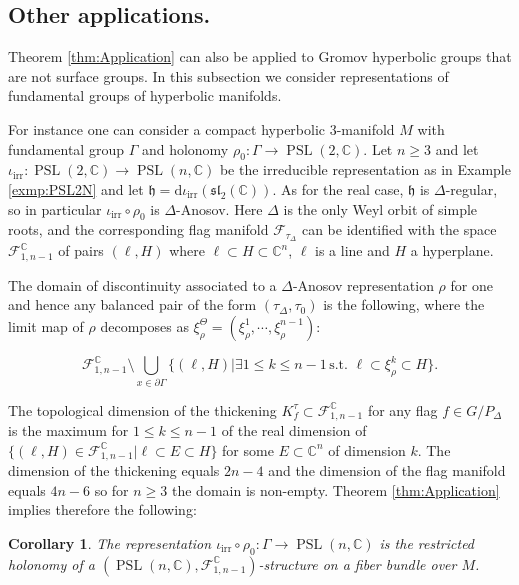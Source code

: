 \documentclass[reqno,10pt]{amsart}
\theoremstyle{plain}
\newtheorem{cor}[thm]{Corollary}
\theoremstyle{definition}
\theoremstyle{remark}
\newcommand{\type}{\tau}
\newcommand{\C}{\mathbb{C}}
\DeclareMathOperator{\PSL}{PSL}
\begin{document}
\subsection{Other applications.}
\label{subsec:HigherDimention}
Theorem \ref{thm:Application} can also be applied to Gromov hyperbolic groups that are not surface groups. In this subsection we consider representations of fundamental groups of hyperbolic manifolds.

\medskip

For instance one can consider a compact hyperbolic $3$-manifold $M$ with fundamental group $\Gamma$ and holonomy $\rho_0:\Gamma\to \PSL(2,\C)$. Let $n\geq 3$ and let $\iota_\text{irr}:\PSL(2,\C)\to \PSL(n,\C)$ be the irreducible representation as in Example \ref{exmp:PSL2N} and let $\mathfrak{h}=\mathrm{d}\iota_\text{irr}(\mathfrak{sl}_2(\C))$. As for the real case, $\mathfrak{h}$ is $\Delta$-regular, so in particular $\iota_\text{irr}\circ \rho_0$ is $\Delta$-Anosov. Here $\Delta$ is the only Weyl orbit of simple roots, and the corresponding flag manifold $\mathcal{F}_{\tau_\Delta}$ can be identified with the space $\mathcal{F}_{1,n-1}^\C$ of pairs $(\ell,H)$ where $\ell\subset H\subset \C^n$, $\ell$ is a line and $H$ a hyperplane. 

\medskip

The domain of discontinuity associated to a $\Delta$-Anosov representation $\rho$ for one and hence any balanced pair of the form $(\type_\Delta, \type_0)$ is the following, where the limit map of $\rho$ decomposes as $\xi_\rho^\Theta=\left(\xi^1_\rho,\cdots ,\xi^{n-1}_\rho\right)$:

$$\mathcal{F}_{1,n-1}^\C\setminus\bigcup_{x\in \partial \Gamma} \lbrace(\ell,H)|\exists 1\leq k\leq n-1 \,\text{s.t. }\ell\subset \xi^k_\rho\subset H \rbrace.$$

The topological dimension of the thickening $K_f^\type\subset \mathcal{F}_{1,n-1}^\C$ for any flag $f\in G/P_\Delta$ is the maximum for $1\leq k\leq n-1$ of the real dimension of $\lbrace (\ell,H)\in \mathcal{F}_{1,n-1}^\C|\ell\subset E\subset H\rbrace $ for some $E\subset \C^n$ of dimension $k$. The dimension of the thickening equals $2n-4$ and the dimension of the flag manifold equals $4n-6$ so for $n\geq 3$ the domain is non-empty. Theorem \ref{thm:Application} implies therefore the following:

\begin{cor}
The representation $\iota_\text{irr}\circ \rho_0:\Gamma \to \PSL(n,\C)$ is the restricted holonomy of a $(\PSL(n,\C),\mathcal{F}_{1,n-1}^\C)$-structure \emph{on a fiber bundle} over $M$.
\end{cor}
\end{document}
